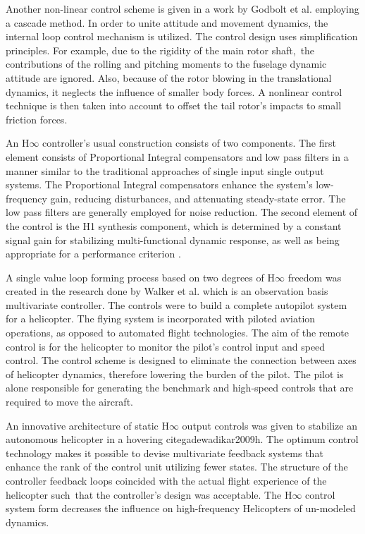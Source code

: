 Another non-linear control scheme is given in a work by Godbolt et al. \cite{godbolt2013experimental} employing a cascade method. In order to unite attitude and movement dynamics, the internal loop control mechanism is utilized. The control design uses simplification principles. For example, due to the rigidity of the main rotor shaft, the contributions of the rolling and pitching moments to the fuselage dynamic attitude are ignored. Also, because of the rotor blowing in the translational dynamics, it neglects the influence of smaller body forces. A nonlinear control technique is then taken into account to offset the tail rotor's impacts to small friction forces. 

An H$\infty$ controller's usual construction consists of two components. The first element consists of Proportional Integral compensators and low pass filters in a manner similar to the traditional approaches of single input single output systems. The Proportional Integral compensators enhance the system's low-frequency gain, reducing disturbances, and attenuating steady-state error. The low pass filters are generally employed for noise reduction. The second element of the control is the H1 synthesis component, which is determined by a constant signal gain for stabilizing multi-functional dynamic response, as well as being appropriate for a performance criterion \cite{kim2003flight,khalil1996robust}.

A single value loop forming process based on two degrees of H$\infty$ freedom was created in the research done by Walker et al. \cite{walker1996advanced} which is an observation basis multivariate controller. The controls were to build a complete autopilot system for a helicopter. The flying system is incorporated with piloted aviation operations, as opposed to automated flight technologies. The aim of the remote control is for the helicopter to monitor the pilot's control input and speed control. The control scheme is designed to eliminate the connection between axes of helicopter dynamics, therefore lowering the burden of the pilot. The pilot is alone responsible for generating the benchmark and high-speed controls that are required to move the aircraft.

An innovative architecture of static H$\infty$ output controls was given to stabilize an autonomous helicopter in a hovering  cite{gadewadikar2009h}. The optimum control technology makes it possible to devise multivariate feedback systems that enhance the rank of the control unit utilizing fewer states. The structure of the controller feedback loops coincided with the actual flight experience of the helicopter such that the controller's design was acceptable. The H$\infty$ control system form decreases the influence on high-frequency Helicopters of un-modeled dynamics.

